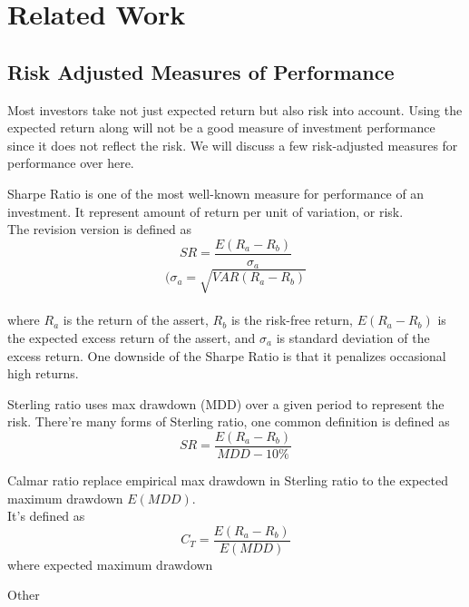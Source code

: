 \chapter{Related Work}
\label{c:related}


\section{Risk Adjusted Measures of Performance}

\par
Most investors take not just expected return but also risk into account. Using the expected return along will not be a good measure of investment performance since it does not reflect the risk. We will discuss a few risk-adjusted measures for performance over here.

Sharpe Ratio\cite{Sharpe49} is one of the most well-known measure for performance of an investment. It represent amount of return per unit of variation, or risk.\\
The revision version is defined as
\[ SR = \frac{E(R_a - R_b)}{\sigma_a}\]
\[(\sigma_a = \sqrt{VAR(R_a-R_b)}\]
\\
where \(R_a\) is the return of the assert, 
\(R_b\) is the risk-free return,
\(E(R_a - R_b)\) is the expected excess return of the assert,
and \(\sigma_a\) is standard deviation of the excess return.
One downside of the Sharpe Ratio is that it penalizes occasional high returns.\cite{9206647}
\par
Sterling ratio\cite{magdon2004maximum} uses max drawdown (MDD) over a given period to represent the risk.
There're many forms of Sterling ratio, one common definition is defined as 
\[ SR = \frac{E(R_a - R_b)}{MDD - 10\%}\]
\par
Calmar ratio\cite{young1991calmar} replace empirical max drawdown in Sterling ratio to the expected maximum drawdown \(E(MDD)\).
\\It's defined as 
\[C_T = \frac{E(R_a - R_b)}{E(MDD)}\]
where expected maximum drawdown \cite{pratap2004maximum}


\par
Other \cite{bacon2009sharp}



